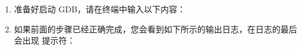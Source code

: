 \documentclass[a4paper,12pt,english]{sphinxmanual}
\begin{document}
\begin{enumerate}
\item {} 
\sphinxAtStartPar
准备好启动 GDB，请在终端中输入以下内容：
\begin{quote}

\begin{sphinxVerbatim}[commandchars=\\\{\}]
   
\end{sphinxVerbatim}
\end{quote}

\item {} 
\sphinxAtStartPar
如果前面的步骤已经正确完成，您会看到如下所示的输出日志，在日志的最后会出现  提示符：


\end{enumerate}
\end{document}
